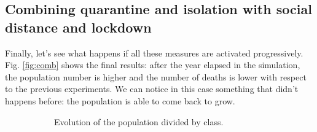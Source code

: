 \documentclass[12pt]{llncs}
\begin{document}
\subsection{Combining quarantine and isolation with social distance and lockdown}
Finally, let's see what happens if all these measures are activated progressively. Fig. \ref{fig:comb} shows the final results: after the year elapsed in the simulation, the population number is higher and the number of deaths is lower with respect to the previous experiments. We can notice in this case something that didn't happens before: the population is able to come back to grow.

\begin{figure}
	\begin{subfigure}{\textwidth}
	\centering
		\caption{Evolution of the population divided by class.} \label{fig:comb-a}
		\end{subfigure}
		\begin{subfigure}{\textwidth}
		\centering
\end{subfigure}
\end{figure}
\end{document}
